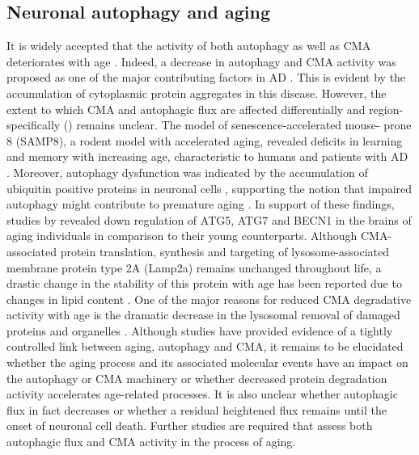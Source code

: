 \subsection{Neuronal autophagy and aging}
It is widely accepted that the activity of both autophagy as well as CMA deteriorates with age \citep{Cuervo2005}. Indeed, a decrease in autophagy and CMA activity was proposed as one of the major contributing factors in AD \citep{Cuervo2005}. This is evident by the accumulation of cytoplasmic protein aggregates in this disease. However, the extent to which CMA and autophagic flux are affected differentially and region-specifically () remains unclear. The model of senescence-accelerated mouse- prone 8 (SAMP8), a rodent model with accelerated aging, revealed deficits in learning and memory with increasing age, characteristic to humans and patients with AD \citep{Ma2011}. Moreover, autophagy dysfunction was indicated by the accumulation of ubiquitin positive proteins in neuronal cells \citep{Ma2011}, supporting the notion that impaired autophagy might contribute to premature aging \citep{Vellai2003}. In support of these findings, studies by \citet{Lipinski2010} revealed down regulation of ATG5, ATG7 and BECN1 in the brains of aging individuals in comparison to their young counterparts. Although CMA-associated protein translation, synthesis and targeting of lysosome-associated membrane protein type 2A (Lamp2a) remains unchanged throughout life, a drastic change in the stability of this protein with age has been reported due to changes in lipid content \citep{Cuervo2014}. One of the major reasons for reduced CMA degradative activity with age is the dramatic decrease in the lysosomal removal of damaged proteins and organelles \citep{Massey2006}. Although studies have provided evidence of a tightly controlled link between aging, autophagy and CMA, it remains to be elucidated whether the aging process and its associated molecular events have an impact on the autophagy or CMA machinery or whether decreased protein degradation activity accelerates age-related processes. It is also unclear whether autophagic flux in fact decreases or whether a residual heightened flux remains until the onset of neuronal cell death. Further studies are required that assess both autophagic flux and CMA activity in the process of aging. 

